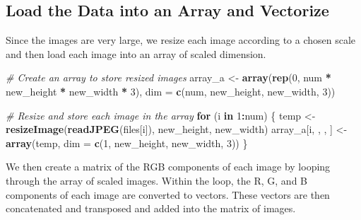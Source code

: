 \documentclass[
]{article}
\newenvironment{Shaded}{\begin{snugshade}}{\end{snugshade}}
\newcommand{\AttributeTok}[1]{\textcolor[rgb]{0.13,0.29,0.53}{#1}}
\newcommand{\CommentTok}[1]{\textcolor[rgb]{0.56,0.35,0.01}{\textit{#1}}}
\newcommand{\ControlFlowTok}[1]{\textcolor[rgb]{0.13,0.29,0.53}{\textbf{#1}}}
\newcommand{\DecValTok}[1]{\textcolor[rgb]{0.00,0.00,0.81}{#1}}
\newcommand{\FunctionTok}[1]{\textcolor[rgb]{0.13,0.29,0.53}{\textbf{#1}}}
\newcommand{\NormalTok}[1]{#1}
\newcommand{\OtherTok}[1]{\textcolor[rgb]{0.56,0.35,0.01}{#1}}
\newcommand{\SpecialCharTok}[1]{\textcolor[rgb]{0.81,0.36,0.00}{\textbf{#1}}}
\begin{document}
\hypertarget{load-the-data-into-an-array-and-vectorize}{%
\subsection{Load the Data into an Array and
Vectorize}\label{load-the-data-into-an-array-and-vectorize}}

Since the images are very large, we resize each image according to a
chosen scale and then load each image into an array of scaled dimension.

\begin{Shaded}
\begin{Highlighting}[]
\CommentTok{\# Create an array to store resized images}
\NormalTok{array\_a }\OtherTok{\textless{}{-}} \FunctionTok{array}\NormalTok{(}\FunctionTok{rep}\NormalTok{(}\DecValTok{0}\NormalTok{, num }\SpecialCharTok{*}\NormalTok{ new\_height }\SpecialCharTok{*}\NormalTok{ new\_width }\SpecialCharTok{*} \DecValTok{3}\NormalTok{), }\AttributeTok{dim =} \FunctionTok{c}\NormalTok{(num, new\_height, new\_width, }\DecValTok{3}\NormalTok{))}

\CommentTok{\# Resize and store each image in the array}
\ControlFlowTok{for}\NormalTok{ (i }\ControlFlowTok{in} \DecValTok{1}\SpecialCharTok{:}\NormalTok{num) \{}
\NormalTok{    temp }\OtherTok{\textless{}{-}} \FunctionTok{resizeImage}\NormalTok{(}\FunctionTok{readJPEG}\NormalTok{(files[i]), new\_height, new\_width)}
\NormalTok{    array\_a[i, , , ] }\OtherTok{\textless{}{-}} \FunctionTok{array}\NormalTok{(temp, }\AttributeTok{dim =} \FunctionTok{c}\NormalTok{(}\DecValTok{1}\NormalTok{, new\_height, new\_width, }\DecValTok{3}\NormalTok{))}
\NormalTok{\}}
\end{Highlighting}
\end{Shaded}

We then create a matrix of the RGB components of each image by looping
through the array of scaled images. Within the loop, the R, G, and B
components of each image are converted to vectors. These vectors are
then concatenated and transposed and added into the matrix of images.
\end{document}
